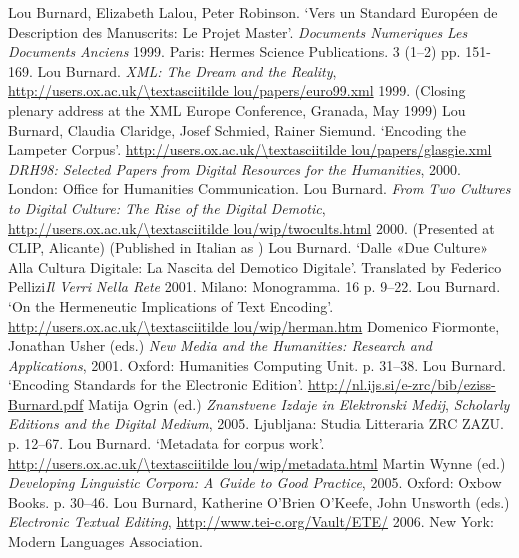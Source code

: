 \begin{bibitemlist}{1}
\label{Burnardetal1999}Lou Burnard, Elizabeth Lalou, Peter Robinson. ‘Vers un Standard Européen de Description des Manuscrits: Le Projet Master’. \textit{Documents Numeriques} \textit{Les Documents Anciens} 1999. Paris: Hermes Science Publications. 3  (1–2)  pp. 151-169. 
\label{Burnard1999}Lou Burnard. \textit{XML: The Dream and the Reality},  \url{http://users.ox.ac.uk/\textasciitilde lou/papers/euro99.xml} 1999.  (Closing plenary address at the XML Europe Conference, Granada, May 1999)
\label{Burnardetal2000}Lou Burnard, Claudia Claridge, Josef Schmied, Rainer Siemund. ‘Encoding the Lampeter Corpus’.  \url{http://users.ox.ac.uk/\textasciitilde lou/papers/glasgie.xml} \textit{DRH98: Selected Papers from Digital Resources for the Humanities}, 2000. London: Office for Humanities Communication. 
\label{Burnard2000}Lou Burnard. \textit{From Two Cultures to Digital Culture: The Rise of the Digital Demotic},  \url{http://users.ox.ac.uk/\textasciitilde lou/wip/twocults.html} 2000.  (Presented at CLIP, Alicante) (Published in Italian as \cite{Burnard2001a})
\label{Burnard2001a}Lou Burnard. ‘Dalle «Due Culture» Alla Cultura Digitale: La Nascita del Demotico Digitale’. Translated by Federico Pellizi\textit{Il Verri} \textit{Nella Rete} 2001. Milano: Monogramma. 16 p. 9–22. 
\label{Burnard2001b}Lou Burnard. ‘On the Hermeneutic Implications of Text Encoding’.  \url{http://users.ox.ac.uk/\textasciitilde lou/wip/herman.htm} Domenico Fiormonte, Jonathan Usher (eds.) \textit{New Media and the Humanities: Research and Applications}, 2001. Oxford: Humanities Computing Unit. p. 31–38. 
\label{Burnard2005a}Lou Burnard. ‘Encoding Standards for the Electronic Edition’.  \url{http://nl.ijs.si/e-zrc/bib/eziss-Burnard.pdf} Matija Ogrin (ed.) \textit{Znanstvene Izdaje in Elektronski Medij}, \textit{Scholarly Editions and the Digital Medium}, 2005. Ljubljana: Studia Litteraria ZRC ZAZU. p. 12–67. 
\label{Burnard2005b}Lou Burnard. ‘Metadata for corpus work’.  \url{http://users.ox.ac.uk/\textasciitilde lou/wip/metadata.html} Martin Wynne (ed.) \textit{Developing Linguistic Corpora: A Guide to Good Practice}, 2005. Oxford: Oxbow Books. p. 30–46. 
\label{Burnardetaleds2006}Lou Burnard, Katherine O'Brien O'Keefe, John Unsworth (eds.) \textit{Electronic Textual Editing},  \url{http://www.tei-c.org/Vault/ETE/} 2006. New York: Modern Languages Association. 

\end{bibitemlist}
